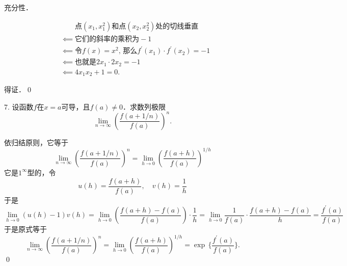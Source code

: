 充分性．

\begin{align}
    &\mathrel{\phantom{\impliedby}} \text{点}(x_1,x_1^2)\text{和点}(x_2,x_2^2)\text{处的切线垂直} \\
    &\impliedby \text{它们的斜率的乘积为} -1 \\
    &\impliedby \text{令}f(x)=x^2, \, \text{那么} f^{\prime}(x_1) \cdot f^{\prime} (x_2) = -1 \\
    &\impliedby \text{也就是} 2x_1 \cdot 2x_2 = -1 \\
    &\impliedby 4x_1 x_2 + 1 = 0.
\end{align}

得证．\qed\bigskip

7. 设函数$f$在$x=a$可导，且$f(a)\neq 0$．求数列极限
\begin{equation}
    \lim_{n \to \infty} \left( \frac{f(a+1/n)}{f(a)} \right)^n .
\end{equation}

\solve 依归结原则，它等于
\begin{equation}
    \lim_{n \to \infty} \left( \frac{f(a+1/n)}{f(a)} \right)^n = \lim_{h \to 0} \left( \frac{f(a+h)}{f(a)}\right)^{1/h}
\end{equation}
它是$1^\infty$型的，令
\begin{equation}
    u(h) = \frac{f(a+h)}{f(a)}, \quad v(h) = \frac{1}{h}
\end{equation}
于是
\begin{equation}
    \lim_{h \to 0} \left(u(h)-1\right)v(h) = \lim_{h \to 0} \left(\frac{f(a+h)-f(a)}{f(a)}\right) \cdot \frac{1}{h} = \lim_{h \to 0} \frac{1}{f(a)} \cdot \frac{f(a+h)-f(a)}{h} = \frac{f^{\prime}(a)}{f(a)}
\end{equation}
于是原式等于
\begin{equation}
    \lim_{n \to \infty} \left( \frac{f(a+1/n)}{f(a)} \right)^n = \lim_{h \to 0} \left( \frac{f(a+h)}{f(a)}\right)^{1/h} = \exp \, \{ \frac{f^{\prime}(a)}{f(a)} \}.
\end{equation}
\qed\bigskip